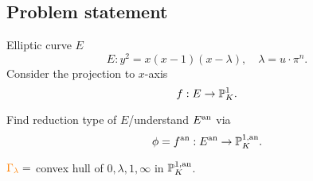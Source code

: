\subsection{Problem statement} \label{sec:problem_statement}
\begin{frame}
	\begin{minipage}[t]{.7\textwidth}
	Elliptic curve $E$	
	\[
		E: y^2 = x(x-1)(x-\lambda), \quad \lambda = u\cdot \pi^{n}
	.\] 
	Consider the projection to $x$-axis 
	\[
	f: E \to \mathbb P^{1}_K
	.\] 
	\end{minipage}
	\begin{minipage}[t]{.29\textwidth}
	\end{minipage}

	\pause

	\begin{question}
	Find reduction type of $E$/understand $E{}^{\text{an}}$ via \[
	\phi = f{}^{\text{an}} : E{}^{\text{an}} \to \mathbb P^{1, \text{an}}_K
	.\] 
	\end{question}

\end{frame}
\begin{frame}
	${\color{orange} \Gamma_\lambda} = $ convex hull of $0, \lambda, 1, \infty$ in $\mathbb P^{1, \text{an}}_K$.
\begin{figure}[ht]
    \centering
\end{figure}
\end{frame}



